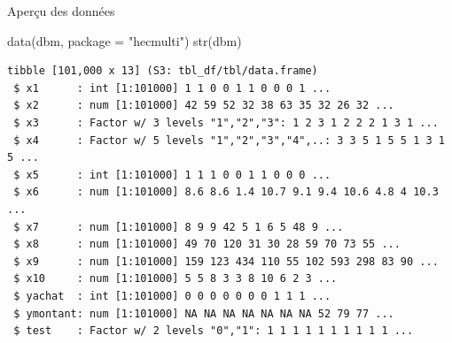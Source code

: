 \documentclass[
  ignorenonframetext,
]{beamer}
\newenvironment{Shaded}{\begin{snugshade}}{\end{snugshade}}
\newcommand{\AttributeTok}[1]{\textcolor[rgb]{0.40,0.45,0.13}{#1}}
\newcommand{\FunctionTok}[1]{\textcolor[rgb]{0.28,0.35,0.67}{#1}}
\newcommand{\NormalTok}[1]{\textcolor[rgb]{0.00,0.23,0.31}{#1}}
\newcommand{\StringTok}[1]{\textcolor[rgb]{0.13,0.47,0.30}{#1}}
\begin{document}
\begin{frame}[fragile]{Aperçu des données}
\label{aperuxe7u-des-donnuxe9es}
\footnotesize

\begin{Shaded}
\begin{Highlighting}[numbers=left,,]
\FunctionTok{data}\NormalTok{(dbm, }\AttributeTok{package =} \StringTok{"hecmulti"}\NormalTok{)}
\FunctionTok{str}\NormalTok{(dbm)}
\end{Highlighting}
\end{Shaded}

\begin{verbatim}
tibble [101,000 x 13] (S3: tbl_df/tbl/data.frame)
 $ x1      : int [1:101000] 1 1 0 0 1 1 0 0 0 1 ...
 $ x2      : num [1:101000] 42 59 52 32 38 63 35 32 26 32 ...
 $ x3      : Factor w/ 3 levels "1","2","3": 1 2 3 1 2 2 2 1 3 1 ...
 $ x4      : Factor w/ 5 levels "1","2","3","4",..: 3 3 5 1 5 5 1 3 1 5 ...
 $ x5      : int [1:101000] 1 1 1 0 0 1 1 0 0 0 ...
 $ x6      : num [1:101000] 8.6 8.6 1.4 10.7 9.1 9.4 10.6 4.8 4 10.3 ...
 $ x7      : num [1:101000] 8 9 9 42 5 1 6 5 48 9 ...
 $ x8      : num [1:101000] 49 70 120 31 30 28 59 70 73 55 ...
 $ x9      : num [1:101000] 159 123 434 110 55 102 593 298 83 90 ...
 $ x10     : num [1:101000] 5 5 8 3 3 8 10 6 2 3 ...
 $ yachat  : int [1:101000] 0 0 0 0 0 0 0 1 1 1 ...
 $ ymontant: num [1:101000] NA NA NA NA NA NA NA 52 79 77 ...
 $ test    : Factor w/ 2 levels "0","1": 1 1 1 1 1 1 1 1 1 1 ...
\end{verbatim}

\normalsize
\end{frame}
\end{document}
